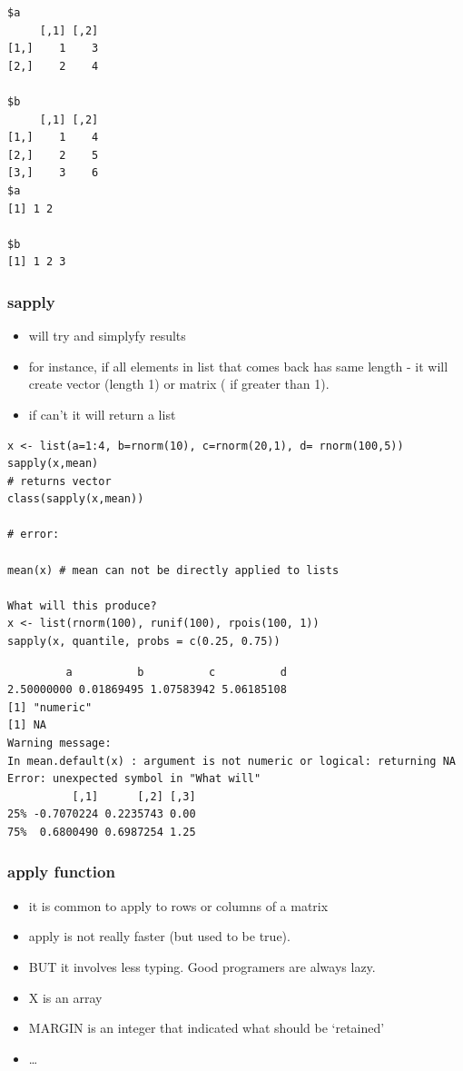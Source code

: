 \documentclass[11pt]{article}
\begin{document}
\begin{verbatim}
$a
     [,1] [,2]
[1,]    1    3
[2,]    2    4

$b
     [,1] [,2]
[1,]    1    4
[2,]    2    5
[3,]    3    6
$a
[1] 1 2

$b
[1] 1 2 3
\end{verbatim}
\subsubsection{sapply}
\label{sec-2-4-2}

\begin{itemize}
\item will try and simplyfy results
\item for instance, if all elements in list that comes back has same
  length - it will create  vector (length 1) or matrix ( if greater
  than 1).
\item if can't it will return a list
\end{itemize}


\begin{verbatim}
x <- list(a=1:4, b=rnorm(10), c=rnorm(20,1), d= rnorm(100,5))
sapply(x,mean)
# returns vector
class(sapply(x,mean))

# error:

mean(x) # mean can not be directly applied to lists

What will this produce?
x <- list(rnorm(100), runif(100), rpois(100, 1))
sapply(x, quantile, probs = c(0.25, 0.75))
\end{verbatim}


\begin{verbatim}
         a          b          c          d 
2.50000000 0.01869495 1.07583942 5.06185108
[1] "numeric"
[1] NA
Warning message:
In mean.default(x) : argument is not numeric or logical: returning NA
Error: unexpected symbol in "What will"
          [,1]      [,2] [,3]
25% -0.7070224 0.2235743 0.00
75%  0.6800490 0.6987254 1.25
\end{verbatim}
\subsubsection{apply function}
\label{sec-2-4-3}

\begin{itemize}
\item it is common to apply to rows or columns of a matrix
\item apply is not really faster (but used to be true).
\item BUT it involves less typing. Good programers are always lazy.
\item X is an array
\item MARGIN is an integer that indicated what should be `retained'
\item \ldots{}
\end{itemize}
\end{document}
